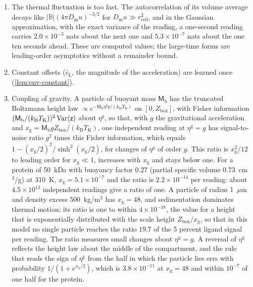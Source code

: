 \begin{example}
\begin{enumerate}
\item[(2)] The thermal fluctuation is too fast. The autocorrelation of its volume average decays like $\lvert\mathbb B\rvert(4\pi D_{\mathrm m}u)^{-3/2}$ for $D_{\mathrm m}u\gg r_{\mathrm{cell}}^2$, and in the Gaussian approximation, with the exact variance of the reading, a one-second reading carries $2.0\times10^{-3}$ nats about the next one and $5.3\times10^{-7}$ nats about the one ten seconds ahead. These are computed values; the large-time forms are leading-order asymptotics without a remainder bound.
\item[(3)] Constant offsets ($\bar c_{\mathrm L}$, the magnitude of the acceleration) are learned once (\cref{lem:env-constant}).
\item[(4)] Coupling of gravity. A particle of buoyant mass $\mathsf M_{\mathrm b}$ has the truncated Boltzmann height law $\propto e^{-\mathsf M_{\mathrm b}\eta^{\mathrm g}\mathsf z/(k_{\mathrm B}T_{\mathrm K})}$ on $[0,Z_{\mathrm{box}}]$, with Fisher information $(\mathsf M_{\mathrm b}/(k_{\mathrm B}T_{\mathrm K}))^2\operatorname{Var}(\mathsf z)$ about $\eta^{\mathrm g}$, so that, with $g$ the gravitational acceleration and $x_{\mathrm g}=\mathsf M_{\mathrm b}gZ_{\mathrm{box}}/(k_{\mathrm B}T_{\mathrm K})$, one independent reading at $\eta^{\mathrm g}=g$ has signal-to-noise ratio $g^2$ times this Fisher information, which equals $1-(x_{\mathrm g}/2)^2/\sinh^2(x_{\mathrm g}/2)$, for changes of $\eta^{\mathrm g}$ of order $g$. This ratio is $x_{\mathrm g}^2/12$ to leading order for $x_{\mathrm g}\ll1$, increases with $x_{\mathrm g}$ and stays below one. For a protein of 50~kDa with buoyancy factor $0.27$ (partial specific volume $0.73$~cm$^3$/g) at 310~K, $x_{\mathrm g}=5.1\times10^{-7}$ and the ratio is $2.2\times10^{-14}$ per reading: about $4.5\times10^{13}$ independent readings give a ratio of one. A particle of radius 1~$\mu$m and density excess 500~kg/m$^3$ has $x_{\mathrm g}=48$, and sedimentation dominates thermal motion: its ratio is one to within $4\times10^{-18}$, the value for a height that is exponentially distributed with the scale height $Z_{\mathrm{box}}/x_{\mathrm g}$, so that in this model no single particle reaches the ratio $19.7$ of the 5 percent ligand signal per reading. The ratio measures small changes about $\eta^{\mathrm g}=g$. A reversal of $\eta^{\mathrm g}$ reflects the height law about the middle of the compartment, and the rule that reads the sign of $\eta^{\mathrm g}$ from the half in which the particle lies errs with probability $1/(1+e^{x_{\mathrm g}/2})$, which is $3.8\times10^{-11}$ at $x_{\mathrm g}=48$ and within $10^{-7}$ of one half for the protein.

\end{enumerate}
\end{example}
